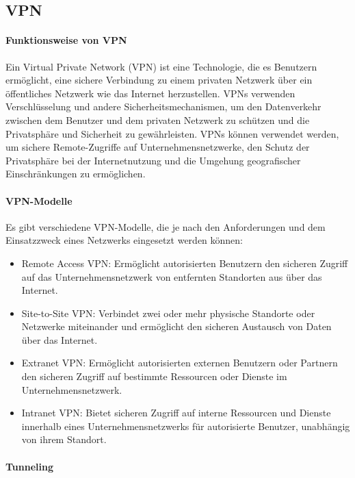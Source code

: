 \subsection{VPN}

\paragraph{Funktionsweise von VPN}

Ein Virtual Private Network (VPN) ist eine Technologie, die es Benutzern ermöglicht, eine sichere Verbindung zu einem privaten Netzwerk über ein öffentliches Netzwerk wie das Internet herzustellen. VPNs verwenden Verschlüsselung und andere Sicherheitsmechanismen, um den Datenverkehr zwischen dem Benutzer und dem privaten Netzwerk zu schützen und die Privatsphäre und Sicherheit zu gewährleisten. VPNs können verwendet werden, um sichere Remote-Zugriffe auf Unternehmensnetzwerke, den Schutz der Privatsphäre bei der Internetnutzung und die Umgehung geografischer Einschränkungen zu ermöglichen.

\paragraph{VPN-Modelle}

Es gibt verschiedene VPN-Modelle, die je nach den Anforderungen und dem Einsatzzweck eines Netzwerks eingesetzt werden können:

\begin{itemize}
	\item Remote Access VPN: Ermöglicht autorisierten Benutzern den sicheren Zugriff auf das Unternehmensnetzwerk von entfernten Standorten aus über das Internet.
	\item Site-to-Site VPN: Verbindet zwei oder mehr physische Standorte oder Netzwerke miteinander und ermöglicht den sicheren Austausch von Daten über das Internet.
	\item Extranet VPN: Ermöglicht autorisierten externen Benutzern oder Partnern den sicheren Zugriff auf bestimmte Ressourcen oder Dienste im Unternehmensnetzwerk.
	\item Intranet VPN: Bietet sicheren Zugriff auf interne Ressourcen und Dienste innerhalb eines Unternehmensnetzwerks für autorisierte Benutzer, unabhängig von ihrem Standort.
\end{itemize}

\paragraph{Tunneling}

